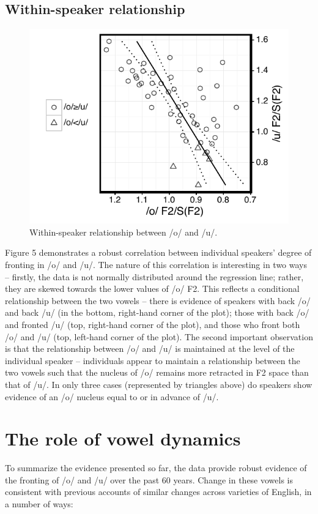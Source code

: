 \documentclass[12pt]{article}
\begin{document}
\subsection{Within-speaker relationship}
\begin{figure}
\centering
\includegraphics{owuwcorrelation.pdf}
\caption{Within-speaker relationship between /o/ and /u/.}
\end{figure}
Figure 5 demonstrates a robust correlation between individual speakers' degree of fronting in /o/ and /u/. The nature of this correlation is interesting in two ways -- firstly, the data is not normally distributed around the regression line; rather, they are skewed towards the lower values of /o/ F2. This reflects a conditional relationship between the two vowels -- there is evidence of speakers with back /o/ and back /u/ (in the bottom, right-hand corner of the plot); those with back /o/ and fronted /u/ (top, right-hand corner of the plot), and those who front both /o/ and /u/ (top, left-hand corner of the plot). The second important observation is that the relationship between /o/ and /u/ is maintained at the level of the individual speaker -- individuals appear to maintain a relationship between the two vowels such that the nucleus of /o/ remains more retracted in F2 space than that of /u/. In only three cases (represented by triangles above) do speakers show evidence of an /o/ nucleus equal to or in advance of /u/.

\section{The role of vowel dynamics}
To summarize the evidence presented so far, the data provide robust evidence of the fronting of /o/ and /u/ over the past 60 years. Change in these vowels is consistent with previous accounts of similar changes across varieties of English, in a number of ways:
\end{document}
